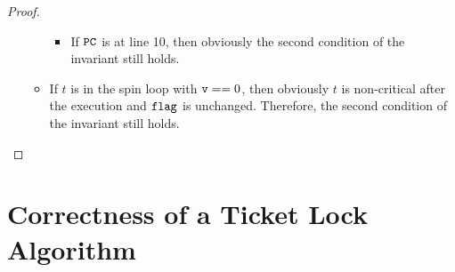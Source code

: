 \documentclass{article}[10pt]
\newcommand{\kwd}[1]{\ensuremath{\text{\ttfamily #1}}\xspace}
\def\kflag{\kwd{flag}}
\def\kv{\kwd{v}}
\begin{document}
\begin{proof}
\begin{itemize}
\begin{itemize}
\begin{itemize}
      \item If \kwd{PC} is at line 10, then obviously the second
        condition of the invariant still holds.

      \end{itemize}

      \item If $t$ is in the spin loop with $\kv == 0$, then obviously
        $t$ is non-critical after the execution and $\kflag$ is
        unchanged. Therefore, the second condition of the invariant
        still holds.
    \end{itemize}
  \end{itemize}
  
\end{proof}


\section{Correctness of a Ticket Lock Algorithm}
\label{sec:ticket-lock}
\end{document}
